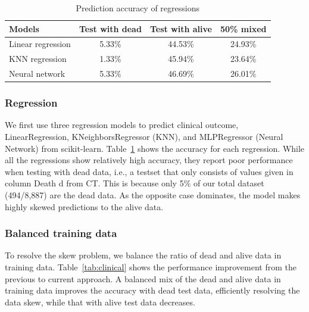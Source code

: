 \begin{table}[!h]
    \centering
    \caption{Prediction accuracy of regressions}
    \begin{tabular}{l||c|c|c}
        \toprule[0.8pt]
         \textbf{Models} & \textbf{Test with dead} & \textbf{Test with alive} & \textbf{50\% mixed} \\\hline
    Linear regression & 5.33\% & 44.53\% & 24.93\% \\
    KNN regression & 1.33\% & 45.94\% & 23.64\% \\
    Neural network & 5.33\% & 46.69\% & 26.01\%\\
        \bottomrule[0.8pt]
    \end{tabular}
    \label{tab:reg}
\end{table}

\subsubsection{Regression}
We first use three regression models to predict clinical outcome, LinearRegression, KNeighborsRegressor (KNN), and MLPRegressor (Neural Network) from scikit-learn.
Table~\ref{tab:reg} shows the accuracy for each regression.
While all the regressions show relatively high accuracy, they report poor performance when testing with dead data, i.e., a testset that only consists of values given in column Death d from CT.
This is because only 5\% of our total dataset (494/8,887) are the dead data.
As the opposite case dominates, the model makes highly skewed predictions to the alive data.



\subsubsection{Balanced training data}
To resolve the skew problem, we balance the ratio of dead and alive data in training data.
Table~\ref{tab:clinical} shows the performance improvement from the previous to current approach.
A balanced mix of the dead and alive data in training data improves the accuracy with dead test data, efficiently resolving the data skew, while that with alive test data decreases.

